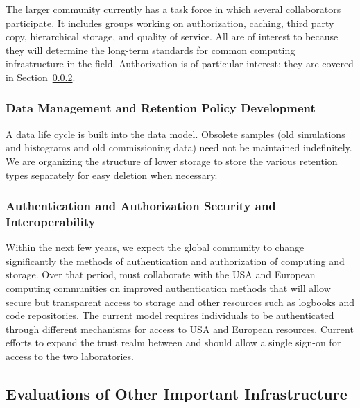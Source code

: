 The larger  community\cite{Berzano:2018xaa} currently has a  task force
 in which several  collaborators participate. %
 It includes groups working on authorization, caching, third party copy, hierarchical storage, and quality of service. All are of interest to  because they will determine the long-term standards for common computing infrastructure in the field. 
Authorization is of particular interest; they are covered in Section~\ref{ch-comp-auth}.


\subsubsection{Data Management and Retention Policy Development}

A data life cycle is built into the  data model.  Obsolete samples (old simulations and histograms and old commissioning data) need not be maintained indefinitely.  
We are organizing the structure of lower storage to store the various retention types separately for easy deletion when necessary.  

\subsubsection{Authentication and Authorization Security and Interoperability}\label{ch-comp-auth}

Within the next few years, we expect the global  community to change significantly the methods of authentication and authorization of computing and storage. 
Over that period,  must collaborate with the USA and European  computing communities on improved authentication methods  that will allow secure but transparent access to storage and other resources such as logbooks and code repositories.  The current model requires individuals to %
be authenticated through different mechanisms for access to USA and European resources. %
Current efforts to expand the trust realm between  and  should allow a single sign-on for access to the two laboratories. %


\subsection{Evaluations of Other Important Infrastructure}

